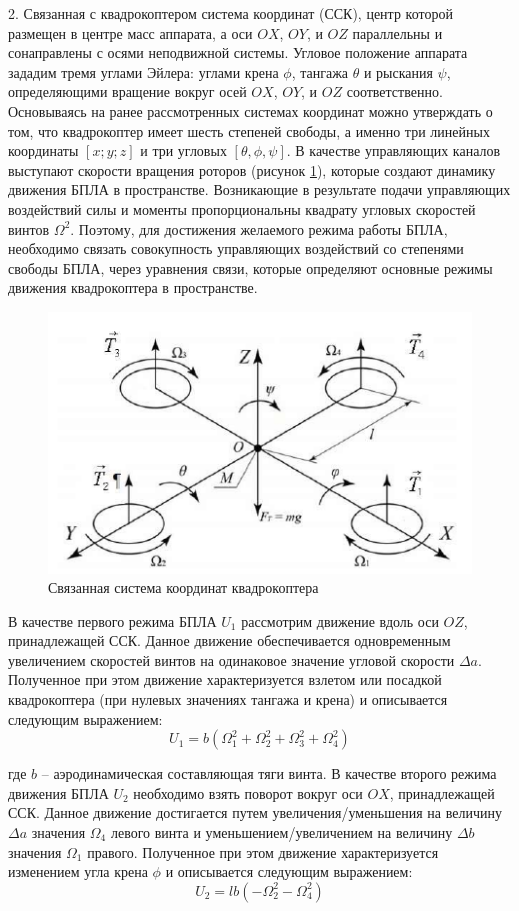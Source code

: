 2. Связанная с квадрокоптером система координат (ССК), центр которой размещен в центре масс аппарата, а оси \(OX\), \(OY\), и \(OZ\) параллельны и сонаправлены с осями неподвижной системы. Угловое положение аппарата зададим тремя углами Эйлера: углами крена \(\phi\), тангажа \(\theta\) и рыскания \(\psi\), определяющими вращение вокруг осей \(OX\), \(OY\), и \(OZ\) соответственно. Основываясь на ранее рассмотренных системах координат можно утверждать о том, что квадрокоптер имеет шесть степеней свободы, а именно три линейных координаты \([x; y; z ]\) и три угловых \([\theta, \phi, \psi]\). В качестве управляющих каналов выступают скорости вращения роторов (рисунок \ref{fig:ris1}), которые создают динамику движения БПЛА в пространстве. Возникающие в результате подачи управляющих воздействий силы и моменты пропорциональны квадрату угловых скоростей винтов \(\Omega^2\). Поэтому, для достижения желаемого режима работы БПЛА, необходимо связать совокупность управляющих воздействий со степенями свободы БПЛА, через уравнения связи, которые определяют основные режимы движения квадрокоптера в пространстве.
\begin{figure}[H]
	\centering
	\includegraphics[width=0.5\linewidth]{../RW/pics/ris1}
	\caption{Связанная система координат квадрокоптера
	}
	\label{fig:ris1}
\end{figure}

В качестве первого режима БПЛА \(U_{1}\) рассмотрим движение вдоль оси \(OZ\), принадлежащей ССК. Данное движение обеспечивается одновременным увеличением скоростей винтов на одинаковое значение угловой скорости \(\Delta a\). Полученное при этом движение характеризуется взлетом или посадкой квадрокоптера (при нулевых значениях тангажа и крена) и описывается следующим выражением:
\begin{equation}
U_{1}=b(\Omega_{1}^2+\Omega_{2}^2+\Omega_{3}^2+\Omega_{4}^2)
\end{equation}

где \(b\) -- аэродинамическая составляющая тяги винта.
В качестве второго режима движения БПЛА \(U_{2}\) необходимо взять поворот вокруг оси \(OX\), принадлежащей ССК. Данное движение достигается путем увеличения/уменьшения на величину \(\Delta a\) значения \(\Omega_{4}\) левого винта и уменьшением/увеличением на величину \(\Delta b\) значения \(\Omega_{1}\)
правого. Полученное при этом движение характеризуется изменением угла крена \(\phi\) и описывается следующим выражением:
\begin{equation}
U_{2}=lb(-\Omega_{2}^2-\Omega_{4}^2)
\end{equation}

